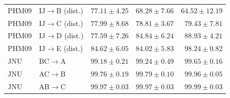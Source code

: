 \begin{table}[pos=htbp]
\begin{tabular}{llrrr}
PHM09 & IJ$\to$B (dist.) & $77.11\pm4.25$ & $68.28\pm7.66$ & $64.52\pm12.19$\\
PHM09 & IJ$\to$C (dist.) & $77.99\pm8.68$ & $78.81\pm3.67$ & $79.43\pm7.81$\\
PHM09 & IJ$\to$D (dist.) & $77.59\pm7.26$ & $84.84\pm6.24$ & $88.93\pm4.21$\\
PHM09 & IJ$\to$E (dist.) & $84.62\pm6.05$ & $84.02\pm5.83$ & $98.24\pm0.82$\\
JNU & BC$\to$A & $99.18\pm0.21$ & $99.24\pm0.49$ & $99.65\pm0.16$\\
JNU & AC$\to$B & $99.76\pm0.19$ & $99.79\pm0.10$ & $99.96\pm0.05$\\
JNU & AB$\to$C & $99.97\pm0.03$ & $99.97\pm0.03$ & $99.99\pm0.03$\\
\bottomrule
\end{tabular}
\end{table}
